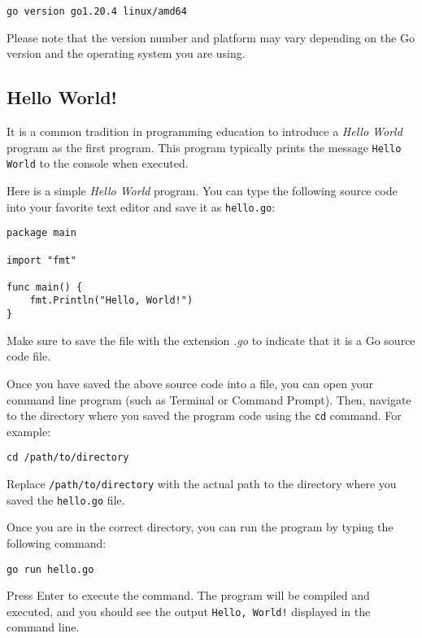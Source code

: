\begin{lstlisting}[numbers=none]
go version go1.20.4 linux/amd64
\end{lstlisting}

Please note that the version number and platform may vary depending on the Go
version and the operating system you are using.

\subsection{Hello World!}

It is a common tradition in programming education to introduce a \textit{Hello
World} program as the first program. This program typically prints the message
\texttt{Hello World} to the console when executed.


Here is a simple \textit{Hello World} program. You can type the following source
code into your favorite text editor and save it as \texttt{hello.go}:

\begin{lstlisting}[caption=Hello World! (hello.go)]
package main

import "fmt"

func main() {
	fmt.Println("Hello, World!")
}
\end{lstlisting}

Make sure to save the file with the extension \textit{.go} to indicate that it
is a Go source code file.

Once you have saved the above source code into a file, you can open your command
line program (such as Terminal or Command Prompt). Then, navigate to the
directory where you saved the program code using the \texttt{cd} command. For
example:

\begin{lstlisting}[numbers=none]
cd /path/to/directory
\end{lstlisting}

Replace \texttt{/path/to/directory} with the actual path to the directory where
you saved the \texttt{hello.go} file.

Once you are in the correct directory, you can run the program by typing the
following command:

\begin{lstlisting}[numbers=none]
go run hello.go
\end{lstlisting}

Press Enter to execute the command. The program will be compiled and executed,
and you should see the output \texttt{Hello, World!} displayed in the command
line.

